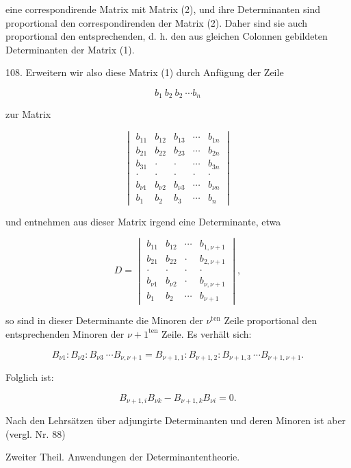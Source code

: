 \documentclass[11pt]{article}
\providecommand{\weberpage}[1]{}
\providecommand{\weq}[2]{\begin{equation}\tag{#1}#2\end{equation}}
\begin{document}
eine correspondirende Matrix mit Matrix (2), und ihre Determinanten sind proportional den correspondirenden der Matrix (2). Daher sind sie auch proportional den entsprechenden, d. h. den aus gleichen Colonnen gebildeten Determinanten der Matrix (1).

108. Erweitern wir also diese Matrix (1) durch Anf\"ugung der Zeile

\[
b_1\ b_2\ b_2\ \cdots b_n
\]

zur Matrix

\weq{4}{
\begin{vmatrix}
b_{11} & b_{12} & b_{13} & \cdots & b_{1n} \\
b_{21} & b_{22} & b_{23} & \cdots & b_{2n} \\
b_{31} & \cdot & \cdot & \cdots & b_{3n} \\
\cdot & \cdot & \cdot & \cdot & \cdot \\
b_{\nu 1} & b_{\nu 2} & b_{\nu 3} & \cdots & b_{\nu n} \\
b_1 & b_2 & b_3 & \cdots & b_n
\end{vmatrix}
}

und entnehmen aus dieser Matrix irgend eine Determinante, etwa

\[
D=
\begin{vmatrix}
b_{11} & b_{12} & \cdots & b_{1,\nu+1} \\
b_{21} & b_{22} & \cdot & b_{2,\nu+1} \\
\cdot & \cdot & \cdot & \cdot \\
b_{\nu 1} & b_{\nu 2} & \cdot & b_{\nu,\nu+1} \\
b_1 & b_2 & \cdots & b_{\nu+1}
\end{vmatrix},
\]

so sind in dieser Determinante die Minoren der $\nu^{\text{ten}}$ Zeile proportional den entsprechenden Minoren der $\nu+1^{\text{ten}}$ Zeile. Es verh\"alt sich:

\[
B_{\nu 1}:B_{\nu 2}:B_{\nu 3}\ \cdots B_{\nu,\nu+1} = B_{\nu+1,1}:B_{\nu+1,2}:B_{\nu+1,3}\ \cdots B_{\nu+1,\nu+1}.
\]

Folglich ist:

\[
B_{\nu+1,i}B_{\nu k} - B_{\nu+1,k}B_{\nu i} = 0.
\]

Nach den Lehrs\"atzen \"uber adjungirte Determinanten und deren Minoren ist aber (vergl. Nr. 88)


\weberpage{114}
 \quad Zweiter Theil. Anwendungen der Determinantentheorie.
\end{document}
